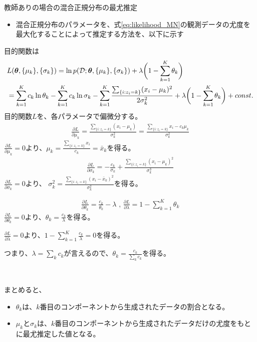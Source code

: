 \documentclass[aspectratio=169,unicode,dvipdfmx,14pt]{beamer}
\begin{document}
\begin{frame}{教師ありの場合の混合正規分布の最尤推定}
\begin{itemize}
\item 混合正規分布のパラメータを、式\eqref{eq:likelihood_MN}の観測データの尤度を最大化することによって推定する方法を、以下に示す
\end{itemize}
\end{frame}


\begin{frame}
\FontMath
\vspace{.1in}
目的関数は
\begin{align}
& L(\bm{\theta},\{ \mu_k \}, \{ \sigma_k \})
= \ln p(\mathcal{D};\bm{\theta},\{ \mu_k \}, \{ \sigma_k \}) 
+ \lambda \bigg( 1 - \sum_{k=1}^K \theta_k \bigg)
\notag \\ &
= \sum_{k=1}^K c_k \ln \theta_k - \sum_{k=1}^K c_k \ln \sigma_k
- \sum_{k=1}^K \frac{\sum_{ \{ i : z_i = k \} } (x_i - \mu_k)^2}{ 2\sigma_k^2} + \lambda \bigg( 1 - \sum_{k=1}^K \theta_k \bigg) + const.
\end{align}
目的関数$L$を、各パラメータで偏微分する。
\begin{align}
\frac{\partial L}{\partial \mu_k} = \frac{ \sum_{ \{ i : z_i = k \} } (x_i - \mu_k) }{\sigma_k^2}
= \frac{ \sum_{ \{ i : z_i = k \} } x_i - c_k \mu_k }{\sigma_k^2}
\end{align}
$\frac{\partial L}{\partial \mu_k} = 0$より、$\mu_k = \frac{ \sum_{ \{ i : z_i = k \} } x_i }{ c_k } = \bar{x}_k$を得る。
\begin{align}
\frac{\partial L}{\partial \sigma_k} = - \frac{c_k}{\sigma_k} + \frac{\sum_{ \{ i : z_i = k \} } (x_i - \mu_k)^2}{ \sigma_k^3}
\end{align}
$\frac{\partial L}{\partial \sigma_k} = 0$より、
$\sigma_k^2 = \frac{\sum_{ \{ i : z_i = k \} } (x_i - \bar{x}_k)^2}{ \sigma_k^2}$を得る。
\end{frame}

\begin{frame}
\FontMath
\begin{align}
\frac{\partial L}{\partial \theta_k} = \frac{c_k}{\theta_k} - \lambda \mbox{ , \ }
\frac{\partial L}{\partial \lambda} = 1 - \sum_{k=1}^K \theta_k
\end{align}
$\frac{\partial L}{\partial \theta_k} = 0$より、$\theta_k = \frac{c_k}{\lambda}$を得る。

$\frac{\partial L}{\partial \lambda} = 0$より、$1 - \sum_{k=1}^K \frac{c_k}{\lambda} = 0$を得る。

つまり、$\lambda = \sum_k c_k$が言えるので、$\theta_k = \frac{c_k}{\sum_k c_k}$を得る。

\

まとめると、
\begin{itemize}
\item $\theta_k$は、$k$番目のコンポーネントから生成されたデータの割合となる。
\item $\mu_k$と$\sigma_k$は、$k$番目のコンポーネントから生成されたデータだけの尤度をもとに最尤推定した値となる。
\end{itemize}
\end{frame}
\end{document}
